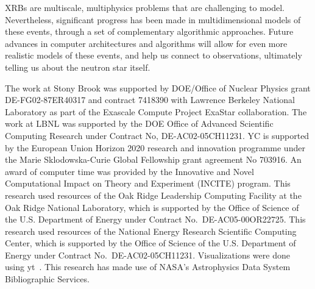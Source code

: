 \documentclass[a4paper]{jpconf}
\begin{document}
XRBs are multiscale, multiphysics problems that are challenging to
model.  Nevertheless, significant progress has been made in
multidimensional models of these events, through a set of
complementary algorithmic approaches.  Future advances in computer
architectures and algorithms will allow for even more realistic models
of these events, and help us connect to observations, ultimately telling
us about the neutron star itself.

\ack The work at Stony Brook was supported by DOE/Office of Nuclear
Physics grant DE-FG02-87ER40317 and contract 7418390 with Lawrence
Berkeley National Laboratory as part of the Exascale Compute Project
ExaStar collaboration.  The work at LBNL was supported by the DOE
Office of Advanced Scientific Computing Research under Contract No,
DE-AC02-05CH11231. YC is supported by the European Union Horizon 2020
research and innovation programme under the Marie Sklodowska-Curie
Global Fellowship grant agreement No 703916.  An award of computer
time was provided by the Innovative and Novel Computational Impact on
Theory and Experiment (INCITE) program. This research used resources
of the Oak Ridge Leadership Computing Facility at the Oak Ridge
National Laboratory, which is supported by the Office of Science of
the U.S. Department of Energy under Contract No.\ DE-AC05-00OR22725.
This research used resources of the National Energy Research
Scientific Computing Center, which is supported by the Office of
Science of the U.S. Department of Energy under Contract
No.\ DE-AC02-05CH11231.  Visualizations were done using yt~\cite{yt}.
This research has made use of NASA's Astrophysics Data System
Bibliographic Services.





\end{document}
